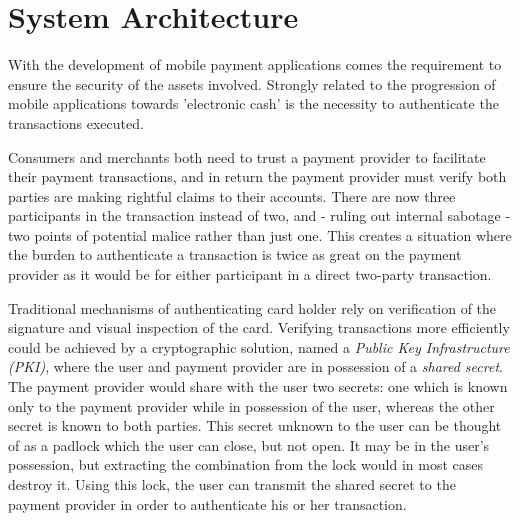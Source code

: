 \section{System Architecture}
\label{chap:hardware_architecture}
With the development of mobile payment applications comes the requirement to ensure the security of the assets involved.
Strongly related to the progression of mobile applications towards 'electronic cash' is the necessity to authenticate the transactions executed. \cite{herzberg2003payments}


Consumers and merchants both need to trust a payment provider to facilitate their payment transactions, and in return the payment provider must verify both parties are making rightful claims to their accounts.
There are now three participants in the transaction instead of two, and - ruling out internal sabotage - two points of potential malice rather than just one.
This creates a situation where the burden to authenticate a transaction is twice as great on the payment provider as it would be for either participant in a direct two-party transaction.

Traditional mechanisms of authenticating card holder rely on verification of the signature and visual inspection of the card.
Verifying transactions more efficiently could be achieved by a cryptographic solution, named a \textit{Public Key Infrastructure (PKI)}, where the user and payment provider are in possession of a \textit{shared secret}.
The payment provider would share with the user two secrets: one which is known only to the payment provider while in possession of the user, whereas the other secret is known to both parties.
This secret unknown to the user can be thought of as a padlock which the user can close, but not open.
It may be in the user's possession, but extracting the combination from the lock would in most cases destroy it.
Using this lock, the user can transmit the shared secret to the payment provider in order to authenticate his or her transaction.


